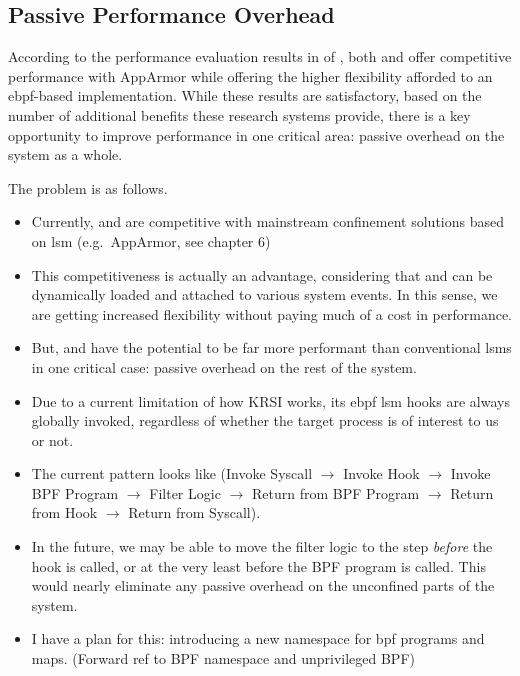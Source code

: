 \subsection{Passive Performance Overhead}

According to the performance evaluation results in  of
, both \bpfbox{} and \bpfcontain{} offer competitive performance with
AppArmor while offering the higher flexibility afforded to an \gls{ebpf}-based
implementation. While these results are satisfactory, based on the number of additional benefits
these research systems provide, there is a key opportunity to improve performance in one
critical area: passive overhead on the system as a whole.

The problem is as follows. 

\begin{inprogress}
  \begin{itemize}
    \item Currently, \bpfbox{} and \bpfcontain{} are competitive with mainstream
    confinement solutions based on \gls{lsm} (e.g.~AppArmor, see chapter 6)
    \item This competitiveness is actually an advantage, considering that \bpfbox{} and
    \bpfcontain{} can be dynamically loaded and attached to various system events. In this sense,
    we are getting increased flexibility without paying much of a cost in performance.
    \item But, \bpfbox{} and \bpfcontain{} have the potential to be far more performant than
    conventional \gls{lsm}s in one critical case: passive overhead on the rest of the system.
    \item Due to a current limitation of how KRSI works, its \gls{ebpf} \gls{lsm} hooks are
    always globally invoked, regardless of whether the target process is of interest to us or not.
    \item The current pattern looks like (Invoke Syscall $\rightarrow$ Invoke Hook
    $\rightarrow$ Invoke BPF Program $\rightarrow$ Filter Logic $\rightarrow$ Return from
    BPF Program $\rightarrow$ Return from Hook $\rightarrow$ Return from Syscall).
    \item In the future, we may be able to move the filter logic to the step
    \textit{before}  the hook is called, or at the very least before the BPF program is
    called. This would nearly eliminate any passive overhead on the unconfined parts of the system.
    \item I have a plan for this: introducing a new namespace for \gls{bpf} programs and
    maps. (Forward ref to BPF namespace and unprivileged BPF)
  \end{itemize}
\end{inprogress}

